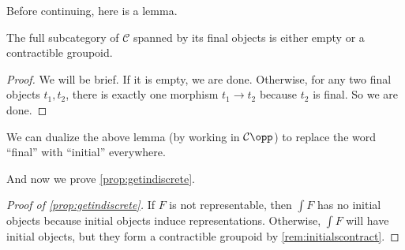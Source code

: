 Before continuing, here is a lemma.
\begin{lemma}
	The full subcategory of $\mathcal C$ spanned by its final objects is either empty or a contractible groupoid.
\end{lemma}
\begin{proof}
	We will be brief. If it is empty, we are done. Otherwise, for any two final objects $t_1,t_2$, there is exactly one morphism $t_1\to t_2$ because $t_2$ is final. So we are done.
\end{proof}
\begin{remark} \label{rem:initialscontract}
	We can dualize the above lemma (by working in $\mathcal C\opp$) to replace the word ``final'' with ``initial'' everywhere.
\end{remark}
And now we prove \autoref{prop:getindiscrete}.
\begin{proof}[Proof of \autoref{prop:getindiscrete}]
	If $F$ is not representable, then $\int F$ has no initial objects because initial objects induce representations. Otherwise, $\int F$ will have initial objects, but they form a contractible groupoid by \autoref{rem:initialscontract}.
\end{proof}

